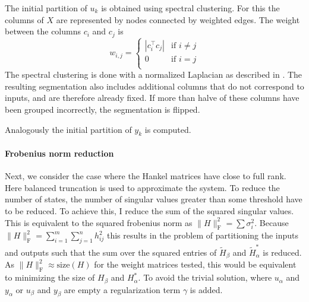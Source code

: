 \documentclass[doctype=mastersthesis,BCOR=15mm,biblatex]{ldvbook}%
\begin{document}
The initial partition of $u_k$ is obtained using spectral clustering.
For this the columns of $X$ are represented by nodes connected by weighted edges.
The weight between the columns $c_i$ and $c_j$ is  
\begin{equation}
w_{i,j}=
\begin{cases}
|c_i^\top c_j| & \text{if } i\neq j\\
0  & \text{if } i=j\\
\end{cases}
\end{equation}
The spectral clustering is done with a normalized Laplacian as described in \cite{higham_spectral_2007}.
The resulting segmentation also includes additional columns that do not correspond to inputs, and are therefore already fixed.
If more than halve of these columns have been grouped incorrectly, the segmentation is flipped.

Analogously the initial partition of $y_k$ is computed.


\paragraph{Frobenius norm reduction}
Next, we consider the case where the Hankel matrices have close to full rank.
Here balanced truncation is used to approximate the system.
To reduce the number of states, the number of singular values greater than some threshold have to be reduced.
To achieve this, I reduce the sum of the squared singular values.
This is equivalent to the squared frobenius norm as $\|H\|_\text{F}^2 = \sum \sigma_i^2$. 
Because $\|H\|_\text{F}^2 = \sum_{i=1}^{m}\sum_{j=1}^{n} h_{ij}^2$ this results in the problem of partitioning the inputs and outputs such that the sum over the squared entries of $\tilde{H}_\beta$ and $\tilde{H}_\alpha^*$ is reduced.
As $\|H\|_\text{F}^2 \approx \text{size}(H)$ for the weight matrices tested, this would be equivalent to minimizing the size of $H_\beta$ and $H_\alpha^*$.
To avoid the trivial solution, where $u_\alpha$ and $y_\alpha$ or $u_\beta$  and $y_\beta$ are empty a regularization term $\gamma$ is added.
\end{document}
